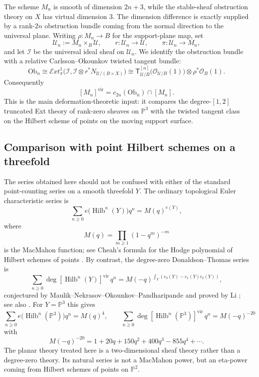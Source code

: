 \documentclass[12pt]{amsart}
\numberwithin{equation}{section}
\newcommand{\PP}{\mathbb{P}}
\newcommand{\OO}{\mathcal{O}}
\newcommand{\Hilb}{\operatorname{Hilb}}
\newcommand{\Ttw}{\mathsf{T}}
\newcommand{\vfc}[1]{[#1]^{\mathrm{vir}}}
\theoremstyle{plain}
\theoremstyle{definition}
\theoremstyle{remark}
\begin{document}
The scheme $M_n$ is smooth of dimension $2n+3$, while the stable-sheaf obstruction theory on $X$ has virtual dimension $3$.
The dimension difference is exactly supplied by a rank-$2n$ obstruction bundle coming from the normal direction to the universal plane.
Writing $\rho\colon M_n\to B$ for the support-plane map, set
\[
\mathcal U_n:=M_n\times_B\mathcal U,
\qquad
r\colon\mathcal U_n\to\mathcal U,
\qquad
\pi\colon\mathcal U_n\to M_n,
\]
and let $\mathcal I$ be the universal ideal sheaf on $\mathcal U_n$.
We identify the obstruction bundle with a relative Carlsson--Okounkov twisted tangent bundle:
\[
\mathrm{Ob}_n\cong
\mathcal Ext^1_{\pi}\bigl(\mathcal I,\mathcal I\otimes r^*N_{\mathcal U/(B\times X)}\bigr)
\cong
\Ttw_{\mathcal U/B}^{[n]}\bigl(\OO_{\mathcal U/B}(1)\bigr)\otimes \rho^*\OO_B(1).
\]
Consequently
\[
\vfc{M_n}=c_{2n}(\mathrm{Ob}_n)\cap [M_n].
\]
This is the main deformation-theoretic input: it compares the degree-$[1,2]$ truncated Ext theory of rank-zero sheaves on $\PP^3$ with the twisted tangent class on the Hilbert scheme of points on the moving support surface.

\subsection{Comparison with point Hilbert schemes on a threefold}
The series obtained here should not be confused with either of the standard point-counting series on a smooth threefold $Y$.
The ordinary topological Euler characteristic series is
\begin{equation}\label{eq:intro-cheah}
\sum_{n\ge 0} e\bigl(\Hilb^n(Y)\bigr)q^n=M(q)^{e(Y)},
\end{equation}
where
\[
M(q)=\prod_{m\ge 1}(1-q^m)^{-m}
\]
is the MacMahon function; see Cheah's formula for the Hodge polynomial of Hilbert schemes of points \cite{Cheah}.
By contrast, the degree-zero Donaldson--Thomas series is
\begin{equation}\label{eq:intro-dt0}
\sum_{n\ge 0}\deg\vfc{\Hilb^n(Y)}\,q^n=M(-q)^{\int_Y(c_3(Y)-c_1(Y)c_2(Y))},
\end{equation}
conjectured by Maulik--Nekrasov--Okounkov--Pandharipande and proved by Li \cite{Li,MNOP}; see also \cite[Remark~3.8]{BBS}.
For $Y=\PP^3$ this gives
\[
\sum_{n\ge 0} e\bigl(\Hilb^n(\PP^3)\bigr)q^n=M(q)^4,
\qquad
\sum_{n\ge 0}\deg\vfc{\Hilb^n(\PP^3)}\,q^n=M(-q)^{-20}
\]
with
\[
M(-q)^{-20}=1+20q+150q^2+400q^3-855q^4+\cdots.
\]
The planar theory treated here is a two-dimensional sheaf theory rather than a degree-zero theory.
Its natural series is not a MacMahon power, but an eta-power coming from Hilbert schemes of points on $\PP^2$.
\end{document}

